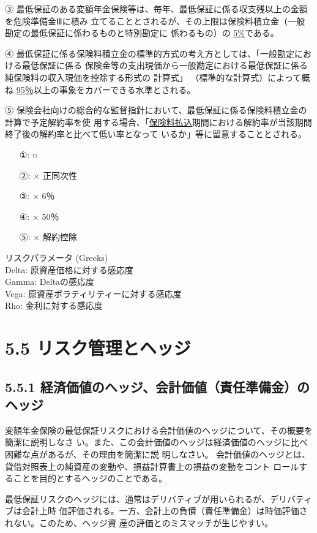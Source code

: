 \documentclass[report,gutter=10mm,fore-edge=10mm,uplatex,dvipdfmx]{jlreq}
\begin{document}
③ 最低保証のある変額年金保険等は、毎年、最低保証に係る収支残以上の金額を危険準備金Ⅲに積み
立てることとされるが、その上限は保険料積立金（一般勘定の最低保証に係わるものと特別勘定に
係わるもの）の \underline{5\%}である。

④ 最低保証に係る保険料積立金の標準的方式の考え方としては、「一般勘定における最低保証に係る
保険金等の支出現価から一般勘定における最低保証に係る純保険料の収入現価を控除する形式の
計算式」
（標準的な計算式）によって概ね \underline{95％}以上の事象をカバーできる水準とされる。

⑤ 保険会社向けの総合的な監督指針において、最低保証に係る保険料積立金の計算で予定解約率を使
用する場合、「\underline{保険料払込}期間における解約率が当該期間終了後の解約率と比べて低い率となって
いるか」等に留意することとされる。
\answer{}
\begin{itemize}
\item[①: ]  ○
\item[②: ]  × 正同次性
\item[③: ]  × 6％
\item[④: ]  × 50％
\item[⑤: ]  × 解約控除
\end{itemize}

リスクパラメータ (Greeks)\\
Delta: 原資産価格に対する感応度\\
Gamma: Deltaの感応度\\
Vega: 原資産ボラティリティーに対する感応度\\
Rho: 金利に対する感応度

\section{5.5 リスク管理とヘッジ}
\subsection{5.5.1 経済価値のヘッジ、会計価値（責任準備金）のヘッジ}
変額年金保険の最低保証リスクにおける会計価値のヘッジについて、その概要を簡潔に説明しなさ
い。また、この会計価値のヘッジは経済価値のヘッジに比べ困難な点があるが、その理由を簡潔に説
明しなさい。
\answer{}
会計価値のヘッジとは、貸借対照表上の純資産の変動や、損益計算書上の損益の変動をコント
ロールすることを目的とするヘッジのことである。

最低保証リスクのヘッジには、通常はデリバティブが用いられるが、デリバティブは会計上時
価評価される。一方、会計上の負債（責任準備金）は時価評価されない。このため、ヘッジ資
産の評価とのミスマッチが生じやすい。
\end{document}
